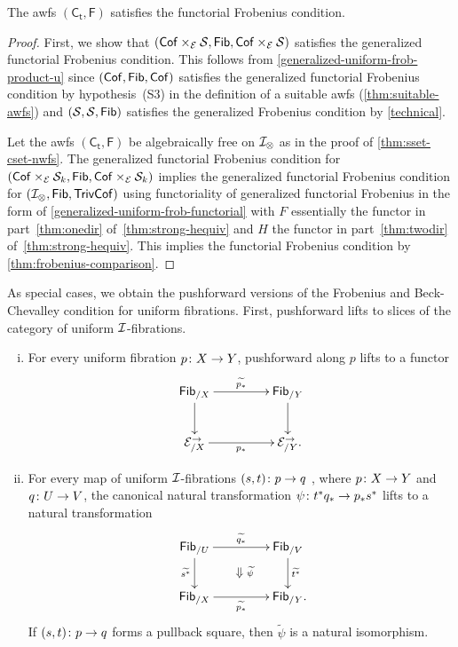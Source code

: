 \documentclass[reqno,10pt,a4paper,oneside,draft]{amsart}
\begin{document}
{{\begin{theorem} \label{uniform-fibrations-uniform-frobenius}
The awfs $(\mathsf{C_t}, \mathsf{F})$ satisfies the functorial Frobenius condition.
\end{theorem}

\begin{proof}
First, we show that $(\Cof \times_{\cal{E}} \cal{S}, \Fib, \Cof \times_{\cal{E}} \cal{S})$ satisfies the generalized functorial Frobenius condition.
This follows from \cref{generalized-uniform-frob-product-u} since $(\Cof, \Fib, \Cof)$ satisfies the generalized functorial Frobenius condition by hypothesis~(S3) in the definition of a suitable awfs (\cref{thm:suitable-awfs}) and $(\cal{S}, \cal{S}, \Fib)$ satisfies the generalized Frobenius condition by \cref{technical}.

Let the awfs $(\mathsf{C_t}, \mathsf{F})$ be algebraically free on $\cal{I}_\otimes$ as in the proof of \cref{thm:sset-cset-nwfs}.
The generalized functorial Frobenius condition for $(\Cof \times_{\cal{E}} \cal{S}_k, \Fib, \Cof \times_{\cal{E}} \cal{S}_k)$ implies the generalized functorial Frobenius condition for $(\cal{I}_\otimes, \Fib, \TrivCof)$ using functoriality of generalized functorial Frobenius in the form of \cref{generalized-uniform-frob-functorial} with $F$ essentially the functor in part~\eqref{thm:onedir} of~\cref{thm:strong-hequiv} and $H$ the functor in part~\eqref{thm:twodir} of~\cref{thm:strong-hequiv}.
This implies the functorial Frobenius condition by \cref{thm:frobenius-comparison}.
\end{proof}

As special cases, we obtain the pushforward versions of the Frobenius and Beck-Chevalley condition for uniform fibrations.
First, pushforward lifts to slices of the category of uniform $\cal{I}$-fibrations.

\begin{corollary} \label{uniform-fibrations-frobenius-pushforward} \leavevmode
\begin{enumerate}[(i)]
\item For every uniform fibration
$p \co X \to Y$, pushforward along $p$ lifts to a functor
\[
\xymatrix@C+2em{
  \Fib_{/X}
  \ar[r]^{\widetilde{p_*}}
  \ar[d]
&
  \Fib_{/Y}
  \ar[d]
\\
  \catE_{/X}^\to
  \ar[r]_{p_*}
&
  \catE_{/Y}^\to
\rlap{.}}
\]
\item For every map of uniform $\cal{I}$-fibrations $(s, t) \co p \to q$ , where $p \co X \to Y$ and $q \co U \to V$, the canonical natural transformation $\psi \co t^* q_* \to p_* s^*$ lifts to a natural transformation
\[
\xymatrix@C+2em{
  \Fib_{/U}
  \ar[r]^{\widetilde{q_*}}
  \ar[d]_{\widetilde{s^*}}
  \ar@{}[dr]|{\textstyle\Downarrow \rlap{$\labelstyle \widetilde{\psi}$}}
&
  \Fib_{/V}
  \ar[d]^{\widetilde{t^*}}
\\
  \Fib_{/X}
  \ar[r]_{\widetilde{p_*}}
&
  \Fib_{/Y}
\rlap{.}}
\]
If $(s, t) \co p \to q$ forms a pullback square, then $\widetilde{\psi}$ is a natural isomorphism.
\end{enumerate}
\end{corollary}

}}
\end{document}
